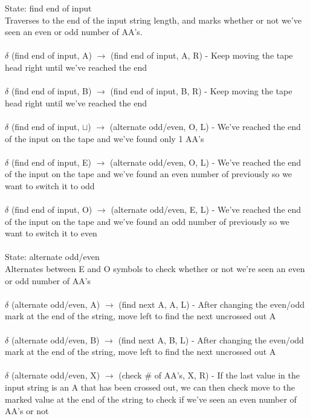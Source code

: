 \documentclass[11pt]{article}
\theoremstyle{definition}
\theoremstyle{theorem}
\begin{document}
\noindent State: find end of input \\ 
Traverses to the end of the input string length, and marks whether or not we've seen an even or odd number of AA's. \\ ~ \\
\noindent$\delta$ (find end of input, A) $\rightarrow$ (find end of input, A, R) - Keep moving the tape head right until we've reached the end\\ ~ \\
\noindent$\delta$ (find end of input, B) $\rightarrow$ (find end of input, B, R) - Keep moving the tape head right until we've reached the end\\ ~ \\
$\delta$ (find end of input, $\sqcup$) $\rightarrow$ (alternate odd/even, O, L) - We've reached the end of the input on the tape and we've found only 1 AA's \\ ~ \\
$\delta$ (find end of input, E) $\rightarrow$ (alternate odd/even, O, L) - We've reached the end of the input on the tape and we've found an even number of previously so we want to switch it to odd \\ ~ \\
$\delta$ (find end of input, O) $\rightarrow$ (alternate odd/even, E, L) - We've reached the end of the input on the tape and we've found an odd number of previously so we want to switch it to even \\ ~ \\

\noindent State: alternate odd/even \\
Alternates between E and O symbols to check whether or not we're seen an even or odd number of AA's \\ ~ \\
\noindent$\delta$ (alternate odd/even, A) $\rightarrow$ (find next A, A, L) - After changing the even/odd mark at the end of the string, move left to find the next uncrossed out A\\ ~ \\
\noindent$\delta$ (alternate odd/even, B) $\rightarrow$ (find next A, B, L) - After changing the even/odd mark at the end of the string, move left to find the next uncrossed out A\\ ~ \\
\noindent$\delta$ (alternate odd/even, X) $\rightarrow$ (check $\#$ of AA's, X, R) - If the last value in the input string is an A that has been crossed out, we can then check move to the marked value at the end of the string to check if we've seen an even number of AA's or not\\ ~ \\
\end{document}

